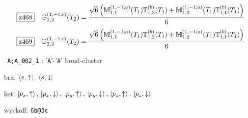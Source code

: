 \documentclass[fleqn,10pt,landscape]{jsarticle}
\begin{document}
\begin{dmath*}
\hspace*{3mm}\fbox{z468}\quad \mathbb{G}_{2,2}^{(1,-1;c)}(T_{2})=\frac{\sqrt{6} \left(\mathbb{M}_{1,1}^{(1,-1;a)}(T_{1}) \mathbb{T}_{1,3}^{(b)}(T_{1}) + \mathbb{M}_{1,3}^{(1,-1;a)}(T_{1}) \mathbb{T}_{1,1}^{(b)}(T_{1})\right)}{6}
\end{dmath*}
\begin{dmath*}
\hspace*{3mm}\fbox{z469}\quad \mathbb{G}_{2,3}^{(1,-1;c)}(T_{2})=\frac{\sqrt{6} \left(\mathbb{M}_{1,1}^{(1,-1;a)}(T_{1}) \mathbb{T}_{1,2}^{(b)}(T_{1}) + \mathbb{M}_{1,2}^{(1,-1;a)}(T_{1}) \mathbb{T}_{1,1}^{(b)}(T_{1})\right)}{6}
\end{dmath*}
\vspace{5mm}

\noindent\textbullet\, \texttt{A;A_002_1} : '\texttt{A}'-'\texttt{A}' bond-cluster

\noindent\quad * bra: $\bra{s_{},\uparrow},\, \bra{s_{},\downarrow}$

\noindent\quad * ket: $\ket{p_{x},\uparrow},\, \ket{p_{x},\downarrow},\, \ket{p_{y},\uparrow},\, \ket{p_{y},\downarrow},\, \ket{p_{z},\uparrow},\, \ket{p_{z},\downarrow}$

\noindent\quad * wyckoff: \texttt{6b@3c}
\end{document}
